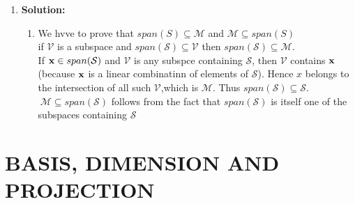 \documentclass[english,onecolumn,UTF8]{IEEEtran}
\begin{document}
\begin{enumerate}
	
	\item \textbf{Solution:}
	\begin{enumerate}
	\item We hvve to prove that $span (S)\subseteq \mathcal M $ and $\mathcal M \subseteq span(S)$
		\\ if $\mathcal V$ is a subspace and $span(\mathcal S) \subseteq \mathcal V$ then $span(\mathcal S) \subseteq \mathcal M$.
		\\If $ \bold x\in span(\mathcal S)$ and $\mathcal V$ is any subspce containing $\mathcal S $,                                                                                                                                                                                                                                                                                                                                                                             
		then $\mathcal V$ contains $\bold x $
		(because $\bold x$ is a linear combinatinn of elements of $\mathcal S $). Hence $x$ belongs to the
		intersection of all such $\mathcal V$,which is $\mathcal M$. Thus $span(\mathcal S)\subseteq \mathcal
		S$.$ \ \mathcal M \subseteq span(\mathcal S)$ follows from the fact that $span(\mathcal S)$ is itself one of 				the subspaces containing $\mathcal S$


	\end{enumerate}

\end{enumerate}










	
\section{BASIS, DIMENSION AND PROJECTION}
\end{document}
